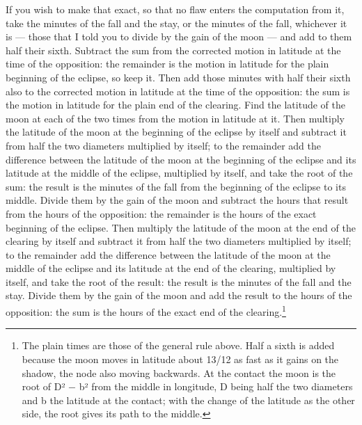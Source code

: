 \documentclass[11pt]{article}
\begin{document}
\par If you wish to make that exact, so that no flaw enters the computation from it, take the minutes of the fall and the stay, or the minutes of the fall, whichever it is — those that I told you to divide by the gain of the moon — and add to them half their sixth. Subtract the sum from the corrected motion in latitude at the time of the opposition: the remainder is the motion in latitude for the plain beginning of the eclipse, so keep it. Then add those minutes with half their sixth also to the corrected motion in latitude at the time of the opposition: the sum is the motion in latitude for the plain end of the clearing. Find the latitude of the moon at each of the two times from the motion in latitude at it. Then multiply the latitude of the moon at the beginning of the eclipse by itself and subtract it from half the two diameters multiplied by itself; to the remainder add the difference between the latitude of the moon at the beginning of the eclipse and its latitude at the middle of the eclipse, multiplied by itself, and take the root of the sum: the result is the minutes of the fall from the beginning of the eclipse to its middle. Divide them by the gain of the moon and subtract the hours that result from the hours of the opposition: the remainder is the hours of the exact beginning of the eclipse. Then multiply the latitude of the moon at the end of the clearing by itself and subtract it from half the two diameters multiplied by itself; to the remainder add the difference between the latitude of the moon at the middle of the eclipse and its latitude at the end of the clearing, multiplied by itself, and take the root of the result: the result is the minutes of the fall and the stay. Divide them by the gain of the moon and add the result to the hours of the opposition: the sum is the hours of the exact end of the clearing.\footnote{The plain times are those of the general rule above. Half a sixth is added because the moon moves in latitude about 13/12 as fast as it gains on the shadow, the node also moving backwards. At the contact the moon is the root of D² − b² from the middle in longitude, D being half the two diameters and b the latitude at the contact; with the change of the latitude as the other side, the root gives its path to the middle.}\par
\end{document}
